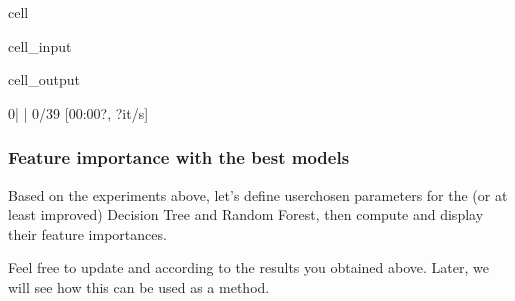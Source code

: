 \documentclass[letterpaper,10pt,english]{jupyterBook}
\begin{document}
\begin{sphinxuseclass}{cell}
\begin{sphinxVerbatimInput}
\begin{sphinxuseclass}{cell_input}
\end{sphinxuseclass}\end{sphinxVerbatimInput}
\begin{sphinxVerbatimOutput}

\begin{sphinxuseclass}{cell_output}
\begin{sphinxVerbatim}[commandchars=\\\{\}]
  0\PYGZpc{}|          | 0/39 [00:00\PYGZlt{}?, ?it/s]
\end{sphinxVerbatim}

\noindent{}

\end{sphinxuseclass}\end{sphinxVerbatimOutput}

\end{sphinxuseclass}

\subsubsection{Feature importance with the best models}
\label{\detokenize{03:feature-importance-with-the-best-models}}
\sphinxAtStartPar
Based on the experiments above, let’s define user\sphinxhyphen{}chosen parameters for the  (or at least improved) Decision Tree and Random Forest, then compute and display their feature importances.

\begin{sphinxShadowBox}
\sphinxstylesidebartitle{}

\sphinxAtStartPar
Feel free to update  and  according to the results you obtained above. Later, we will see how this can be used as a  method.
\end{sphinxShadowBox}
\end{document}
